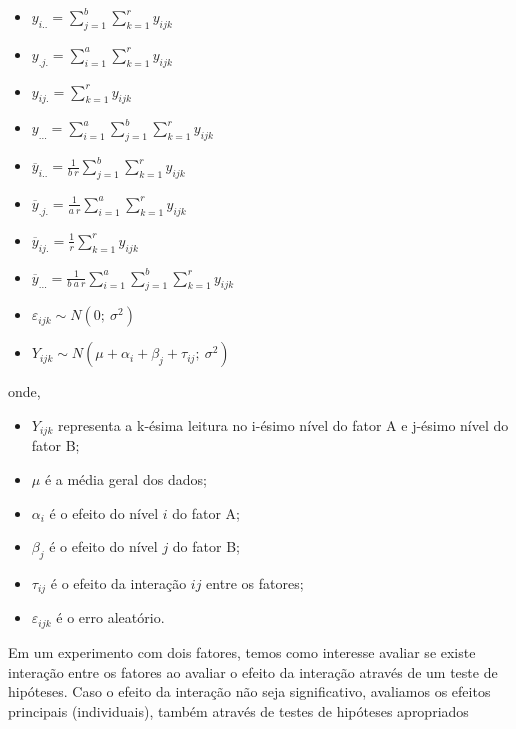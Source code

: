 \documentclass[
]{book}
\providecommand{\tightlist}{%
  \setlength{\itemsep}{0pt}\setlength{\parskip}{0pt}}
\begin{document}
\begin{itemize}
\tightlist
\item
  \(y_{i..} = \sum_{j=1}^{b}\sum_{k=1}^{r}y_{ijk}\)
\item
  \(y_{.j.}=\sum_{i=1}^{a}\sum_{k=1}^{r}y_{ijk}\)
\item
  \(y_{ij.}=\sum_{k=1}^{r}y_{ijk}\)
\item
  \(y_{...}=\sum_{i=1}^{a}\sum_{j=1}^{b}\sum_{k=1}^{r}y_{ijk}\)
\item
  \(\overline{y}_{i..}=\frac{1}{b~r}\sum_{j=1}^{b}\sum_{k=1}^{r}y_{ijk}\)
\item
  \(\overline{y}_{.j.}=\frac{1}{a~r}\sum_{i=1}^{a}\sum_{k=1}^{r}y_{ijk}\)
\item
  \(\overline{y}_{ij.}=\frac{1}{r}\sum_{k=1}^{r}y_{ijk}\)
\item
  \(\overline{y}_{...}=\frac{1}{b~a~r}\sum_{i=1}^{a}\sum_{j=1}^{b}\sum_{k=1}^{r}y_{ijk}\)
\item
  \(\varepsilon_{ijk}\sim N(0;~\sigma^2)\)
\item
  \(Y_{ijk}\sim N(\mu +\alpha_i+\beta_j+\tau_{ij};~\sigma^2)\)
\end{itemize}

onde,

\begin{itemize}
\tightlist
\item
  \(Y_{ijk}\) representa a k-ésima leitura no i-ésimo nível do fator A e j-ésimo nível do fator B;
\item
  \(\mu\) é a média geral dos dados;
\item
  \(\alpha_i\) é o efeito do nível \(i\) do fator A;
\item
  \(\beta_j\) é o efeito do nível \(j\) do fator B;
\item
  \(\tau_{ij}\) é o efeito da interação \(ij\) entre os fatores;
\item
  \(\varepsilon_{ijk}\) é o erro aleatório.
\end{itemize}

Em um experimento com dois fatores, temos como interesse avaliar se existe interação entre os fatores ao avaliar o efeito da interação através de um teste de hipóteses. Caso o efeito da interação não seja significativo, avaliamos os efeitos principais (individuais), também através de testes de hipóteses apropriados
\end{document}
